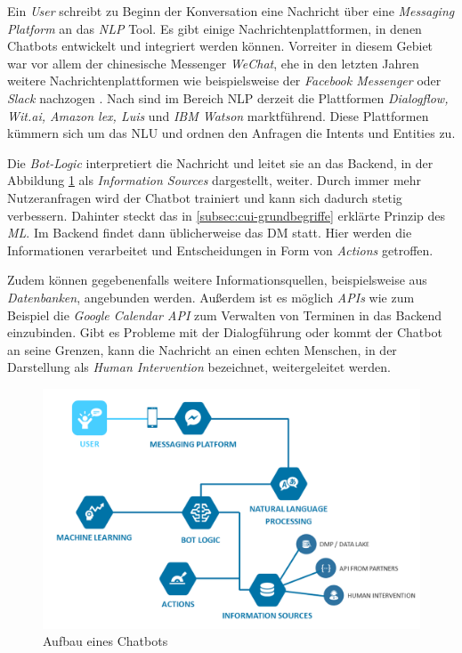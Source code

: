Ein \textit{User} schreibt zu Beginn der Konversation eine Nachricht über eine \textit{Messaging Platform} an das \textit{\acl{NLP}} Tool. Es gibt einige Nachrichtenplattformen, in denen Chatbots entwickelt und integriert werden können. Vorreiter in diesem Gebiet war vor allem der chinesische Messenger \textit{WeChat}, ehe in den letzten Jahren weitere Nachrichtenplattformen wie beispielsweise der \textit{Facebook Messenger} oder \textit{Slack} nachzogen \cite{rocketbots.io_china_2017}. Nach \cite{riya_study_2018} sind im Bereich \acl{NLP} derzeit die Plattformen \textit{Dialogflow, Wit.ai, Amazon lex, Luis} und \textit{IBM Watson} marktführend. Diese Plattformen kümmern sich um das \acl{NLU} und ordnen den Anfragen die Intents und Entities zu. 

Die \textit{Bot-Logic} interpretiert die Nachricht und leitet sie an das Backend, in der Abbildung \ref{fig:aufbau-chatbot} als \textit{Information Sources} dargestellt, weiter. Durch immer mehr Nutzeranfragen wird der Chatbot trainiert und kann sich dadurch stetig verbessern. Dahinter steckt das in \ref{subsec:cui-grundbegriffe} erklärte Prinzip des \textit{\acl{ML}}. Im Backend findet dann üblicherweise das \acl{DM} statt. Hier werden die Informationen verarbeitet und Entscheidungen in Form von \textit{Actions} getroffen. 

Zudem können gegebenenfalls weitere Informationsquellen, beispielsweise aus \textit{Datenbanken}, angebunden werden. Außerdem ist es möglich \textit{\acp{API}} wie zum Beispiel die \textit{Google Calendar API} zum Verwalten von Terminen in das Backend einzubinden. Gibt es Probleme mit der Dialogführung oder kommt der Chatbot an seine Grenzen, kann die Nachricht an einen echten Menschen, in der Darstellung als \textit{Human Intervention} bezeichnet, weitergeleitet werden. \cite{fourault_ultimate_2017}
\newline

\begin{figure}[htb]
    \centering
    \includegraphics[width=1\textwidth]{bilder/aufbau-chatbot_v2.png}
    \caption{Aufbau eines Chatbots \cite{fourault_ultimate_2017}}
    \label{fig:aufbau-chatbot}
\end{figure}


